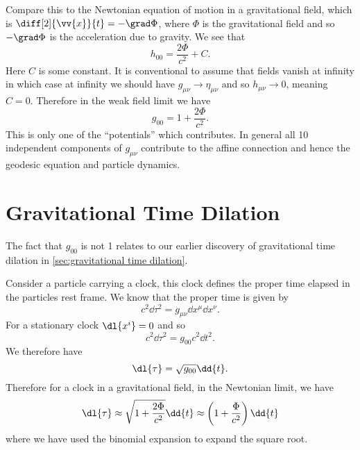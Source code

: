 \documentclass[fleqn]{NotesClass}
\begin{document}
    Compare this to the Newtonian equation of motion in a gravitational field, which is \(\diff[2]{\vv{x}}{t} = -\grad \Phi\), where \(\Phi\) is the gravitational field and so \(-\grad \Phi\) is the acceleration due to gravity.
    We see that
    \begin{equation}
        h_{00} = \frac{2\Phi}{c^2} + C.
    \end{equation}
    Here \(C\) is some constant.
    It is conventional to assume that fields vanish at infinity in which case at infinity we should have \(g_{\mu\nu} \to \eta_{\mu\nu}\) and so \(h_{\mu\nu} \to 0\), meaning \(C = 0\).
    Therefore in the weak field limit we have
    \begin{equation}
        g_{00} = 1 + \frac{2\Phi}{c^2}.
    \end{equation}
    This is only one of the \enquote{potentials} which contributes.
    In general all 10 independent components of \(g_{\mu\nu}\) contribute to the affine connection and hence the geodesic equation and particle dynamics.
    
    \section{Gravitational Time Dilation}
    The fact that \(g_{00}\) is not 1 relates to our earlier discovery of gravitational time dilation in \cref{sec:gravitational time dilation}.
    
    Consider a particle carrying a clock, this clock defines the proper time elapsed in the particles rest frame.
    We know that the proper time is given by
    \begin{equation}
        c^2\dd{\tau}^2 = g_{\mu\nu}\dd{x^\mu}\dd{x^\nu}.
    \end{equation}
    For a stationary clock \(\dl{x^i} = 0\) and so
    \begin{equation}
        c^2\dd{\tau}^2 = g_{00}c^2\dd{t^2}.
    \end{equation}
    We therefore have
    \begin{equation}
        \dl{\tau} = \sqrt{g_{00}} \dd{t}.
    \end{equation}
    Therefore for a clock in a gravitational field, in the Newtonian limit, we have
    \begin{equation}
        \dl{\tau} \approx \sqrt{1 + \frac{2\Phi}{c^2}} \dd{t} \approx \left( 1 + \frac{\Phi}{c^2} \right)\dd{t}
    \end{equation}
    where we have used the binomial expansion to expand the square root.
    
\end{document}
